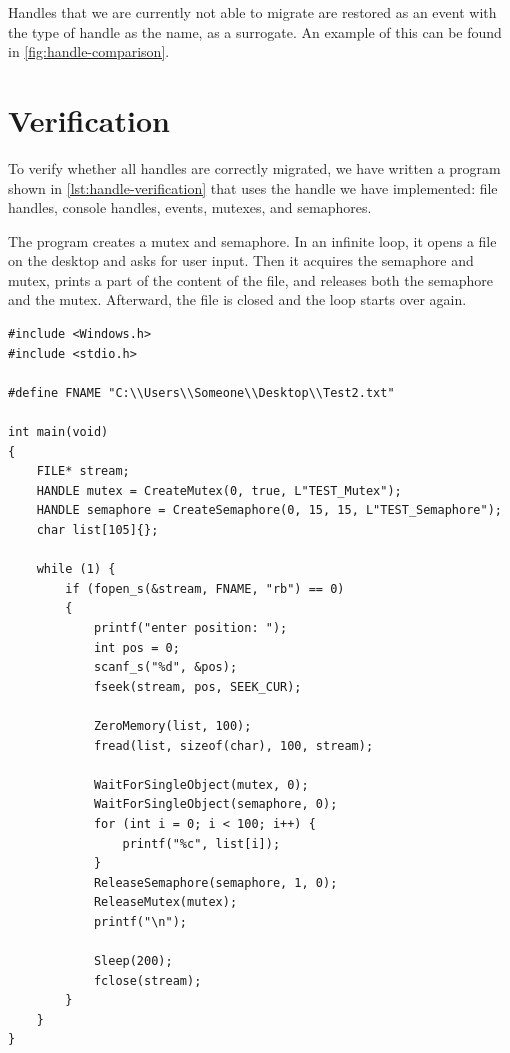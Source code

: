 \documentclass[a4paper, 11pt, english]{report}
\begin{document}
Handles that we are currently not able to migrate are restored as an event with the type of handle as the name, as a surrogate. An example of this can be found in \autoref{fig:handle-comparison}.

\section{Verification}
\label{sec:verification-handle}
To verify whether all handles are correctly migrated, we have written a program shown in \autoref{lst:handle-verification} that uses the handle we have implemented: file handles, console handles, events, mutexes, and semaphores.

The program creates a mutex and semaphore. In an infinite loop, it opens a file on the desktop and asks for user input. Then it acquires the semaphore and mutex, prints a part of the content of the file, and releases both the semaphore and the mutex. Afterward, the file is closed and the loop starts over again.

\clearpage

\begin{lstlisting}[label=lst:handle-verification,language={[Visual]C++},caption={Our program to verify handles}]
#include <Windows.h>
#include <stdio.h>

#define FNAME "C:\\Users\\Someone\\Desktop\\Test2.txt"

int main(void)
{
    FILE* stream;
    HANDLE mutex = CreateMutex(0, true, L"TEST_Mutex");
    HANDLE semaphore = CreateSemaphore(0, 15, 15, L"TEST_Semaphore");
    char list[105]{};

    while (1) {
        if (fopen_s(&stream, FNAME, "rb") == 0)
        {   
            printf("enter position: ");
            int pos = 0;
            scanf_s("%d", &pos);
            fseek(stream, pos, SEEK_CUR);

            ZeroMemory(list, 100);
            fread(list, sizeof(char), 100, stream);

            WaitForSingleObject(mutex, 0);
            WaitForSingleObject(semaphore, 0);
            for (int i = 0; i < 100; i++) {
                printf("%c", list[i]);
            }
            ReleaseSemaphore(semaphore, 1, 0);
            ReleaseMutex(mutex);
            printf("\n");

            Sleep(200);
            fclose(stream);
        }
    }
}
\end{lstlisting}
\end{document}
